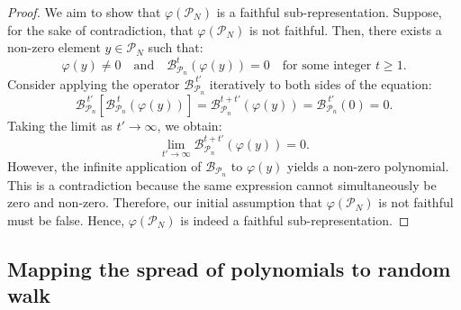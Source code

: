 \documentclass[journal=jctcce,a4paper,manuscript=article]{achemso}
\begin{document}
\begin{proof}
  We aim to show that $\varphi(\mathcal{P}_N)$ is a faithful sub-representation.
  Suppose, for the sake of contradiction, that $\varphi(\mathcal{P}_N)$ is not
  faithful. Then, there exists a non-zero element $y \in \mathcal{P}_N$ such
  that:
  \[
    \varphi(y) \neq 0 \quad \text{and} \quad \mathcal{B}_{\mathcal{P}_n}^t (\varphi(y)) = 0 \quad \text{for some integer } t \geq 1.
  \]
  Consider applying the operator $\mathcal{B}_{\mathcal{P}_n}^{~t'}$ iteratively
  to both sides of the equation:
  \[
    \mathcal{B}_{\mathcal{P}_n}^{~t'} \left[ \mathcal{B}_{\mathcal{P}_n}^{~t} (\varphi(y)) \right] = \mathcal{B}_{\mathcal{P}_n}^{t + t'} (\varphi(y)) = \mathcal{B}_{\mathcal{P}_n}^{~t'} (0) = 0.
  \]
  Taking the limit as $t' \to \infty$, we obtain:
  \[
    \lim_{t' \to \infty} \mathcal{B}_{\mathcal{P}_n}^{t + t'} (\varphi(y)) = 0.
  \]
  However, the infinite application of $\mathcal{B}_{\mathcal{P}_n}$ to
  $\varphi(y)$ yields a non-zero polynomial. This is a contradiction because the
  same expression cannot simultaneously be zero and non-zero. Therefore, our
  initial assumption that $\varphi(\mathcal{P}_N)$ is not faithful must be false.
  Hence, $\varphi(\mathcal{P}_N)$ is indeed a faithful sub-representation.

\end{proof}

\subsection{Mapping the spread of polynomials to random walk}
\label{sec: mapping the action of tensors to random walk}
\end{document}

